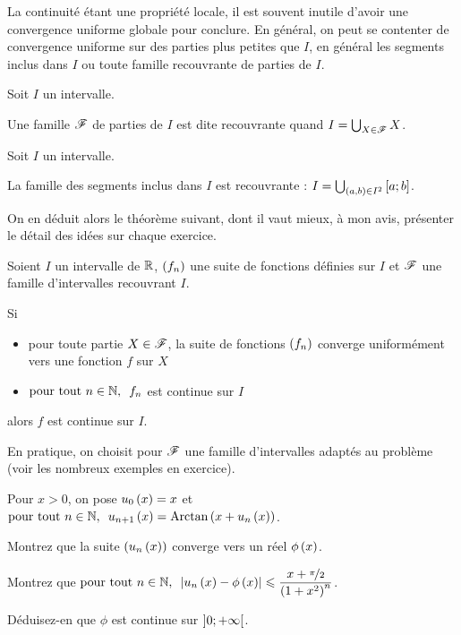 La continuité étant une propriété locale, il est souvent inutile d'avoir une convergence uniforme globale pour conclure. En général, on peut se contenter de convergence uniforme sur des parties plus petites que \(I\), en général les segments inclus dans \(I\) ou toute famille recouvrante de parties de \(I\).

\begin{defi}
Soit \(I\) un intervalle.

Une famille \(\mathscr{F}\) de parties de \(I\) est dite recouvrante quand \(I=\bigcup_{X\in\mathscr{F}}X\).
\end{defi}

\begin{prop}
Soit \(I\) un intervalle.

La famille des segments inclus dans \(I\) est recouvrante : \(I=\bigcup_{\left(a,b\right)\in I^2}\left[a;b\right]\).
\end{prop}

On en déduit alors le théorème suivant, dont il vaut mieux, à mon avis, présenter le détail des idées sur chaque exercice.

\begin{theo}
Soient \(I\) un intervalle de \(\mathbb{R}\), \(\left(f_n\right)\) une suite de fonctions définies sur \(I\) et \(\mathscr{F}\) une famille d'intervalles recouvrant \(I\).

Si

\begin{itemize}
    \item pour toute partie \(X\in\mathscr{F}\), la suite de fonctions \(\left(f_n\right)\) converge uniformément vers une fonction \(f\) sur \(X\) \\
    \item \(\quantifs{\tpt n\in\N}f_n\) est continue sur \(I\)
\end{itemize}

alors \(f\) est continue sur \(I\).
\end{theo}

En pratique, on choisit pour \(\mathscr{F}\) une famille d'intervalles adaptés au problème (voir les nombreux exemples en exercice).

\begin{exo}
Pour \(x>0\), on pose \(u_0\left(x\right)=x\) et \(\quantifs{\tpt n\in\N}u_{n+1}\paren{x}=\Arctan\paren{x+u_n\paren{x}}\).

Montrez que la suite \(\left(u_n\left(x\right)\right)\) converge vers un réel \(\phi\left(x\right)\).

Montrez que \(\quantifs{\tpt n\in\N}\abs{u_n\paren{x}-\phi\paren{x}}\leq\dfrac{x+\nicefrac{\pi}{2}}{\paren{1+x^2}^n}\).

Déduisez-en que \(\phi\) est continue sur \(\left]0;+\infty\right[\).
\end{exo}

